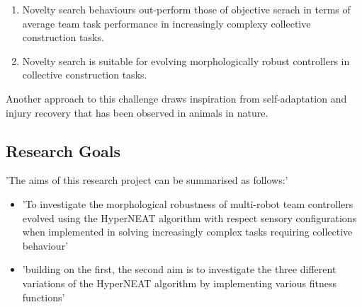 \begin{enumerate}
	\item Novelty search behaviours out-perform those of objective serach in terms of average team task performance in increasingly complexy collective construction tasks.
	\item Novelty search is suitable for evolving morphologically robust controllers in collective construction tasks.
\end{enumerate}


Another approach to this challenge draws inspiration from self-adaptation and injury recovery that has been observed in animals in nature.







\subsection{Research Goals}

'The aims of this research project can be summarised as follows:'
\begin{itemize}
	\item 'To investigate the morphological robustness of multi-robot team controllers evolved using the HyperNEAT algorithm with respect sensory configurations when implemented in solving increasingly complex tasks requiring collective behaviour'
	\item 'building on the first, the second aim is to investigate the three different variations of the HyperNEAT algorithm by implementing various fitness functions'
\end{itemize}

